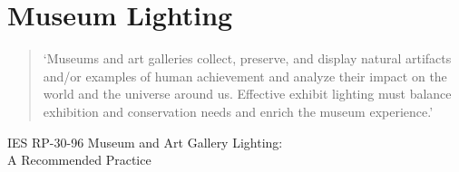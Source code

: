 \section{Museum Lighting}

\begin{quote}
`Museums and art galleries collect, preserve, and display natural artifacts and/or examples of human achievement and analyze their impact on the world and the universe around us. Effective exhibit lighting must balance exhibition and conservation needs and enrich the museum experience.'
\end{quote}

\begin{flushright}IES RP-30-96 Museum and Art Gallery Lighting: \\A Recommended Practice \citep{ies_ies_1996}\end{flushright}

